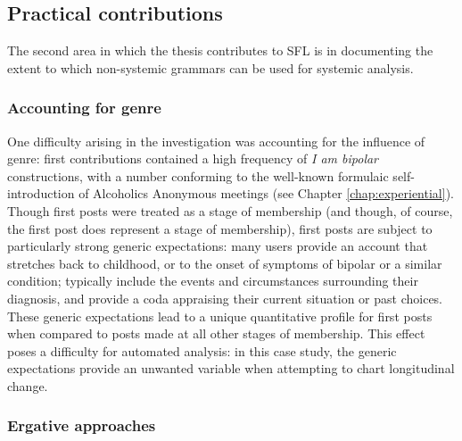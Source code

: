 
\subsection{Practical contributions}

The second area in which the thesis contributes to \gls{SFL} is in documenting the extent to which non\hyp{}systemic grammars can be used for systemic analysis.


\subsubsection{Accounting for genre}

\noindent One difficulty arising in the investigation was accounting for the influence of genre: first contributions contained a high frequency of \emph{I am bipolar} constructions, with a number conforming to the well\hyp{}known formulaic self\hyp{}introduction of Alcoholics Anonymous meetings (see Chapter \ref{chap:experiential}). Though first \glspl{post} were treated as a stage of membership (and though, of course, the first \gls{post} does represent a stage of membership), first \glspl{post} are subject to particularly strong generic expectations: many users provide an account that stretches back to childhood, or to the onset of symptoms of bipolar or a similar condition;  typically include the events and circumstances surrounding their diagnosis, and provide a coda appraising their current situation or past choices. These generic expectations lead to a unique quantitative profile for first \glspl{post} when compared to \glspl{post} made at all other stages of membership. This effect poses a difficulty for automated analysis: in this case study, the generic expectations provide an unwanted variable when attempting to chart longitudinal change.


\subsubsection{Ergative approaches}

